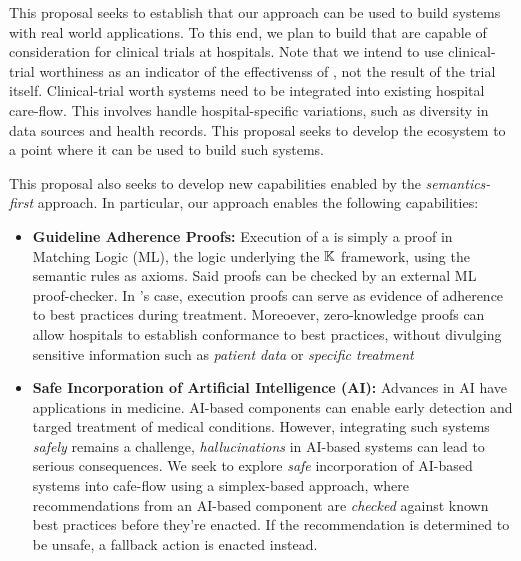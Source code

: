 This proposal
seeks to establish that our approach can be used to build systems with real
world applications. To this end, we plan to build \CDSSs{} that are
capable of consideration for clinical trials at hospitals. Note that we
intend to use clinical-trial worthiness as an indicator of the effectivenss
of \MediK{}, not the result of the trial itself.
Clinical-trial worth systems need to be integrated into existing hospital care-flow.
This involves handle hospital-specific variations, such as
diversity in data sources and health records. This proposal seeks to
develop the \MediK{} ecosystem to a point where it can be used to build
such systems.

This proposal also seeks to develop new \CDSS{} capabilities enabled by the
\emph{semantics-first} approach. In particular, our approach
enables the following capabilities:

\begin{itemize}
  \item \textbf{Guideline Adherence Proofs:} Execution of a
\MediK{} \BPG{} is simply a proof in Matching Logic (ML), the logic
underlying the $\mathbb{K}{}$ framework, using the semantic rules as axioms.
Said proofs can be checked by an external ML proof-checker.
In \MediK{}'s case, execution proofs can serve as evidence of adherence to best practices during treatment.
Moreoever, zero-knowledge proofs can allow hospitals to establish
conformance to best practices, without divulging sensitive information
such as \emph{patient data} or \emph{specific treatment}
  \item \textbf{Safe Incorporation of Artificial Intelligence (AI):}
Advances in AI have applications in medicine. AI-based components
can enable early detection and targed treatment of medical conditions.
However, integrating such systems \emph{safely} remains a challenge,
\emph{hallucinations} in AI-based systems can lead to serious consequences.
We seek to explore \emph{safe} incorporation of AI-based systems into cafe-flow using
a simplex-based approach, where recommendations from an AI-based component are
\emph{checked} against known best practices before they're enacted.
If the recommendation is determined to be unsafe, a fallback action is enacted
instead.
\end{itemize}


